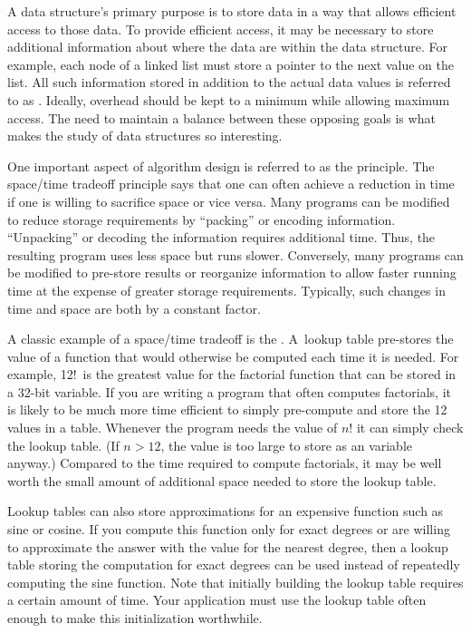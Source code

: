 A data structure's primary purpose is to store data in a way that
allows efficient access to those data.
To provide efficient access, it may be necessary to store
additional information about where the data are within the data
structure.
For example, each node of a linked list must store a pointer to the
next value on the list.
All such information stored in addition to the actual data values is
referred to as .
Ideally, overhead should be kept to a minimum while allowing maximum
access.
The need to maintain a balance between these opposing goals is what
makes the study of data structures so interesting.

One important aspect of algorithm design is referred to as
the  principle.
The space/time tradeoff principle says that one can often achieve a
reduction in time if one is willing to sacrifice space or
vice versa.
Many programs can be modified to reduce storage requirements by
``packing'' or encoding information.
``Unpacking'' or decoding the information requires additional
time.
Thus, the resulting program uses less space but runs slower.
Conversely, many programs can be modified to pre-store results or
reorganize information to allow faster running time at the expense of
greater storage requirements.
Typically, such changes in time and space are both by a constant
factor.

A classic example of a space/time tradeoff is the
.
A~lookup table pre-stores the value of a function that would
otherwise be computed each time it is needed.
For example, 12!~is the greatest value for the
factorial function that
can be stored in a 32-bit  variable.
If you are writing a program that often computes
factorials,
it is likely to be much more time efficient to simply pre-compute
and store the 12 values in a table.
Whenever the program needs the value of \(n!\) it can
simply check the lookup table.
(If \(n > 12\), the value is too large
to store as an  variable anyway.)
Compared to the time required to compute factorials, it may be well
worth the small amount of additional space needed to store the
lookup table.

Lookup tables can also store approximations
for an expensive function such as sine or cosine.
If you compute this function only for exact degrees or are
willing to approximate the answer with the value for the nearest
degree, then a lookup table storing the computation for exact degrees
can be used instead of repeatedly computing the sine function.
Note that initially building the lookup table requires a certain
amount of time.
Your application must use the lookup table often
enough to make this initialization worthwhile.

